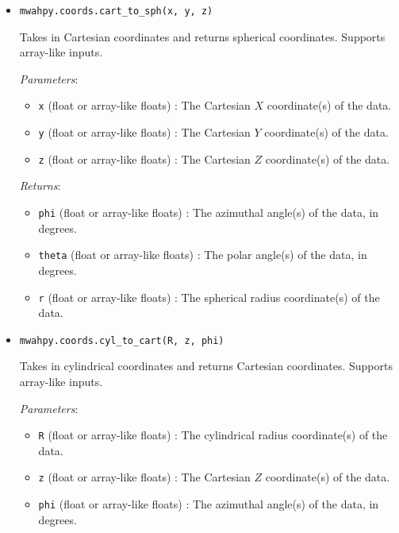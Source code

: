 \documentclass{article}
\begin{document}
\begin{itemize}
\item \verb!mwahpy.coords.cart_to_sph(x, y, z)!

Takes in Cartesian coordinates and returns spherical coordinates. Supports array-like inputs.

\textit{Parameters}: \begin{itemize}

\item \verb!x! (float or array-like floats) : The Cartesian $X$ coordinate(s) of the data.

\item \verb!y! (float or array-like floats) : The Cartesian $Y$ coordinate(s) of the data.

\item \verb!z! (float or array-like floats) : The Cartesian $Z$ coordinate(s) of the data.

\end{itemize}

\textit{Returns}: \begin{itemize}

\item \verb!phi! (float or array-like floats) : The azimuthal angle(s) of the data, in degrees.

\item \verb!theta! (float or array-like floats) : The polar angle(s) of the data, in degrees.

\item \verb!r! (float or array-like floats) : The spherical radius coordinate(s) of the data.

\end{itemize}



\item \verb!mwahpy.coords.cyl_to_cart(R, z, phi)!

Takes in cylindrical coordinates and returns Cartesian coordinates. Supports array-like inputs.

\textit{Parameters}: \begin{itemize}

\item \verb!R! (float or array-like floats) : The cylindrical radius coordinate(s) of the data.

\item \verb!z! (float or array-like floats) : The Cartesian $Z$ coordinate(s) of the data.

\item \verb!phi! (float or array-like floats) : The azimuthal angle(s) of the data, in degrees.


\end{itemize}
\end{itemize}
\end{document}
